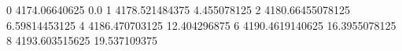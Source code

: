 0 4174.06640625 0.0
1 4178.521484375 4.455078125
2 4180.66455078125 6.59814453125
4 4186.470703125 12.404296875
6 4190.4619140625 16.3955078125
8 4193.603515625 19.537109375

